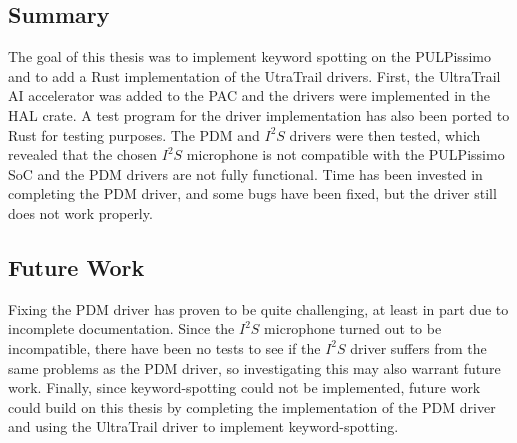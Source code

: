 
\subsection{Summary}

The goal of this thesis was to implement keyword spotting on the PULPissimo and to add a Rust implementation of the UtraTrail drivers.
First, the UltraTrail AI accelerator was added to the PAC and the drivers were implemented in the HAL crate.
A test program for the driver implementation has also been ported to Rust for testing purposes.
The PDM and $I^2S$ drivers were then tested, which revealed that the chosen $I^2S$
microphone is not compatible with the PULPissimo SoC and the PDM drivers are not fully functional.
Time has been invested in completing the PDM driver, and some bugs have been fixed, but the driver still does not work properly.

\subsection{Future Work}

Fixing the PDM driver has proven to be quite challenging, at least in part due to incomplete documentation.
Since the $I^2S$ microphone turned out to be incompatible, there have been no tests to see if the $I^2S$
driver suffers from the same problems as the PDM driver, so investigating this may also warrant future work.
Finally, since keyword-spotting could not be implemented, future work could build on this thesis by completing
the implementation of the PDM driver and using the UltraTrail driver to implement keyword-spotting.
